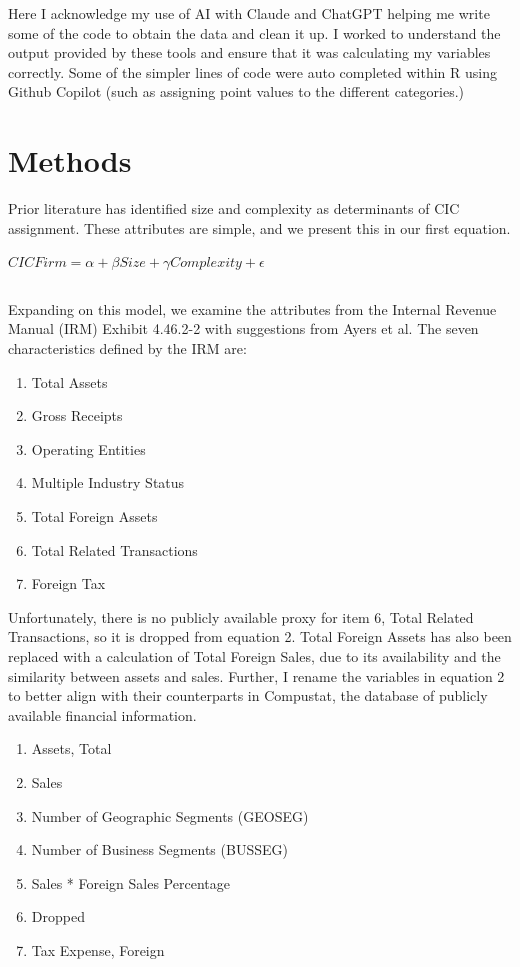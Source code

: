\documentclass[12pt]{article}
\begin{document}
Here I acknowledge my use of AI with Claude and ChatGPT helping me write some of the code to obtain the data and clean it up. I worked to understand the output provided by these tools and ensure that it was calculating my variables correctly. Some of the simpler lines of code were auto completed within R using Github Copilot (such as assigning point values to the different categories.)

\section{Methods}
Prior literature has identified size and complexity as determinants of CIC assignment.\citep {Mills1998} \citep{Hanlon2007} These attributes are simple, and we present this in our first equation.
\vspace{\baselineskip}

\begin{center}
\(CICFirm = \alpha  + \beta Size + \gamma Complexity + \epsilon\)

\begin{equation}
\label{eq:CICSimple}
\end{equation}
\end{center}
\vspace{\baselineskip}

Expanding on this model, we examine the attributes from the Internal Revenue Manual (IRM) Exhibit 4.46.2-2 with suggestions from Ayers et al.\citep{Ayers2019} The seven characteristics defined by the IRM are:
\begin{enumerate}
   \item Total Assets
   \item Gross Receipts
   \item Operating Entities
   \item Multiple Industry Status
   \item Total Foreign Assets
   \item Total Related Transactions
   \item Foreign Tax
\end{enumerate}

Unfortunately, there is no publicly available proxy for item 6, Total Related Transactions, so it is dropped from equation 2. Total Foreign Assets has also been replaced with a calculation of Total Foreign Sales, due to its availability and the similarity between assets and sales. Further, I rename the variables in equation 2 to better align with their counterparts in Compustat, the database of publicly available financial information.
\begin{enumerate}
   \item Assets, Total
   \item Sales
   \item Number of Geographic Segments (GEOSEG)
   \item Number of Business Segments (BUSSEG)
   \item Sales * Foreign Sales Percentage
   \item Dropped
   \item Tax Expense, Foreign
\end{enumerate}
\end{document}
